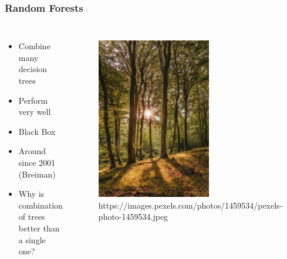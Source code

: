 \begin{frame}
	\frametitle{Random Forests}
	\begin{columns}[onlytextwidth]
		\begin{itemize}
			\item Combine many decision trees
			\item Perform very well
			\item Black Box
			\item Around since 2001 (Breiman)
			\item Why is combination of trees better than a single one?
		\end{itemize}
		
		\begin{figure}
			\includegraphics[width=0.6\textwidth]{pics/real_forest.jpg}
			\tiny{https://images.pexels.com/photos/1459534/pexels-photo-1459534.jpeg}
		\end{figure}
	\end{columns}
\end{frame}

